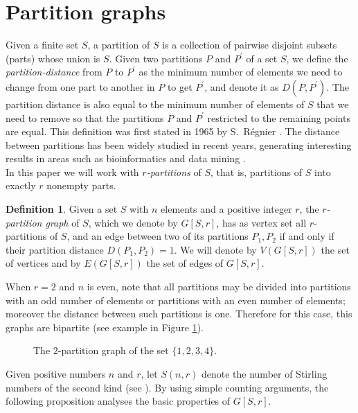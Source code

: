 \documentclass[11pt,a4paper]{article}
\theoremstyle{plain}
\theoremstyle{definition}
\newtheorem{definition}{Definition}
\begin{document}
\section{Partition graphs}\label{sec:partitiongraphs}
Given a finite set $S$, a partition of $S$ is a collection of pairwise disjoint subsets (parts) whose union is $S$. Given two partitions $P$ and $P^\prime$ of a set $S$, we define the \emph{partition-distance} from $P$ to $P^\prime$ as the minimum number of elements we need to change from one part to another in $P$ to get $P^\prime$, and denote it as $D(P, P^\prime)$. The partition distance is also equal to the minimum number of elements of $S$ that we need to remove so that the partitions $P$ and $P^\prime$ restricted to the remaining points are equal. This definition  was first stated in 1965 by S.\ R\'{e}gnier \cite{regnier1983quelques}.
The distance between partitions has been widely studied in recent years, generating interesting results in areas such as bioinformatics \cite{almudevar1999estimation, konovalov2005partition} and data mining \cite{gusfield2002partition}.\\
In this paper we will work with \emph{$r$-partitions} of $S$, that is, partitions of $S$ into exactly $r$ nonempty parts. 

\begin{definition}
Given a set $S$ with $n$ elements and a positive integer $r$, the \emph{$r$-partition graph} of $S$, which we denote by $G[S,r]$, has as vertex set all $r$-partitions of $S$, and an edge between two of its partitions $P_1,P_2$ if and only if their partition distance $D(P_1, P_2)=1$. We will denote by $V(G[S,r])$ the set of vertices and by $E(G[S,r])$ the set of edges of $G[S,r]$.
\end{definition}

When $r=2$ and $n$ is even, note that all partitions may be divided into partitions with an odd number of elements or partitions with an even number of elements; moreover the distance between such partitions is one. Therefore for this case, this graphs are bipartite (see example in Figure \ref{prisms}).    

\begin{figure}[h]
\centering

\caption{The $2$-partition graph of the set $\{1,2,3,4\}$.}\label{prisms}
\end{figure}



Given positive numbers $n$ and $r$, let $S(n,r)$ denote the number of Stirling numbers of the second kind (see \cite[p.~76]{riordan2012introduction}). By using simple counting arguments, the following proposition analyses the basic properties of $G[S,r]$.  
\end{document}

